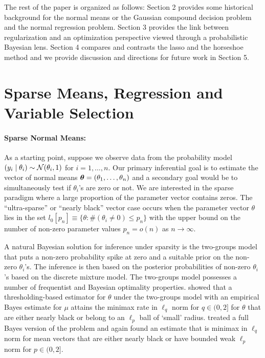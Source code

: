 \documentclass[11pt]{article}
\begin{document}

The rest of the paper is organized as follows: Section 2 provides some historical background for the normal means or the Gaussian compound decision problem and the normal regression problem. Section 3 provides the link between regularization and an optimization perspective viewed through a probabilistic Bayesian lens. Section 4 compares and contrasts the lasso and the horseshoe method and we provide discussion and directions for future work in Section 5. 

\section{Sparse Means, Regression and Variable Selection}

\paragraph{Sparse Normal Means:} As a starting point, suppose we observe data from the probability model $  (y_i \mid \theta_i)  \sim {\cal N} (\theta_i,1)$ for $i = 1, \ldots, n$. Our primary inferential goal is to estimate the vector of normal means $ \boldsymbol{\theta} = ( \theta_1, \ldots , \theta_n )$ and a secondary goal would be to simultaneously test if $\theta_i$'s are zero or not. We are interested in the sparse paradigm where a large proportion of the parameter vector contains zeros.  The ``ultra-sparse'' or ``nearly black'' vector case occurs when the parameter vector $\theta$ lies in the set $ l_0 [ p_n] \equiv \{ \theta : \# ( \theta_i \neq 0 ) \leq p_n \} $ with the upper bound on the number of non-zero parameter values $ p_n = o(n) $ as $ n \to \infty$. 

A natural Bayesian solution for inference under sparsity is the two-groups model that puts a non-zero probability spike at zero and a suitable prior on the non-zero $\theta_i$'s. The inference is then based on the posterior probabilities of non-zero $\theta_i$'s based on the discrete mixture model. The two-groups model possesses a number of frequentist and Bayesian optimality properties. \cite{johnstone2004needles} showed that a thresholding-based estimator for $\theta$ under the two-groups model with an empirical Bayes estimate for $\mu$ attains the minimax rate in $\ell_q$ norm for $q \in (0,2]$ for $\theta$ that are either nearly black or belong to an $\ell_p$ ball of `small' radius. \cite{castillo2012needles} treated a full Bayes version of the problem and again found an estimate that is minimax in $\ell_q$ norm for mean vectors that are either nearly black or have bounded weak $\ell_p$ norm for $p \in (0,2]$. 
\end{document}
